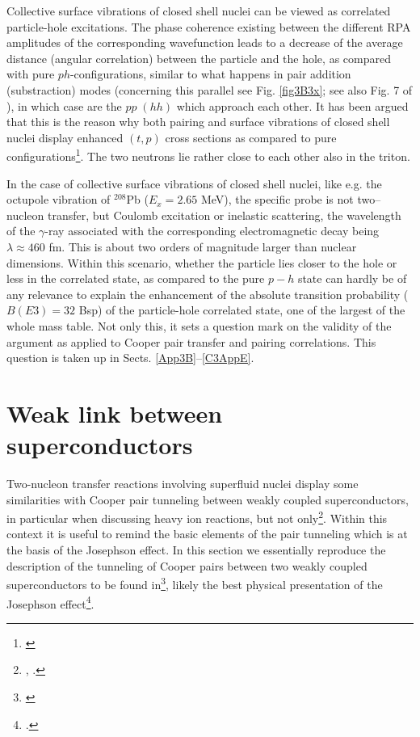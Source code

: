 Collective surface vibrations of closed shell nuclei can be viewed as correlated particle-hole excitations. The phase coherence existing between the different RPA amplitudes of the corresponding wavefunction leads to a decrease of the average distance (angular correlation) between the particle and the hole, as compared with pure $ph$-configurations, similar to what happens in pair addition (substraction) modes (concerning this parallel see Fig. \ref{fig3B3x}; see also Fig. 7 of \cite{Barranco:19b}),  in which case are the $pp\;(hh)$ which approach each other. It has been argued that this is the reason why both pairing and surface vibrations of closed shell nuclei display enhanced $(t,p)$ cross sections as compared to pure configurations\footnote{\cite{Bertsch:67}}. The two neutrons lie rather close to each other also in the triton.


In the case of collective surface vibrations of closed shell nuclei, like e.g. the octupole vibration of $^{208}$Pb ($E_x=2.65$ MeV), the specific probe is not two--nucleon transfer, but Coulomb excitation or inelastic scattering,  the wavelength of the $\gamma$-ray associated with the corresponding electromagnetic decay being $\lambda\approx 460$ fm. This is about two orders of magnitude larger than nuclear dimensions. Within this scenario, whether  the particle lies closer to the hole or less in the correlated state, as compared to the pure $p-h$ state can hardly be of any relevance to explain  the enhancement of the absolute transition probability ($B(E3)=32$ Bsp) of the particle-hole correlated state, one of the largest of the whole mass table. Not only this, it sets a question mark on the validity of the argument as applied to Cooper pair transfer and pairing correlations. This question is taken up in Sects.  
\ref{App3B}--\ref{C3AppE}.








\section{Weak link between superconductors}\label{C3AppC}
Two-nucleon transfer reactions involving superfluid nuclei display some similarities with Cooper pair tunneling between weakly coupled superconductors, in particular when discussing heavy ion reactions, but not only\footnote{\cite{Goldanskii:68,Dietrich:70,Dietrich:71,Hara:71,Kleber:71,Weiss:79}, \cite{vonOertzen:01,Oertzen:13,Broglia:04a}.}. Within this context it is useful to remind the basic elements of the pair tunneling which is at the basis of the Josephson effect. 
In this section we essentially reproduce the description of the tunneling of Cooper pairs between two weakly coupled superconductors to be found in\footnote{\cite{Anderson:64b}}, likely the best physical presentation of the Josephson effect\footnote{\cite{Josephson:62}.}.


